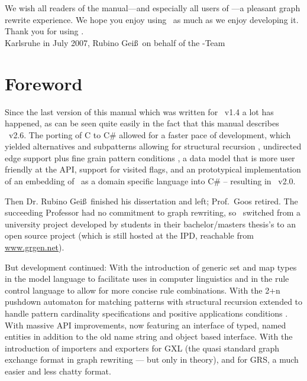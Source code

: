 We wish all readers of the manual---and especially all users of \GrG---a pleasant graph rewrite experience.
We hope you enjoy using \GrG\ as much as we enjoy developing it.\\[3ex]

Thank you for using \GrG.\\[6ex]

\noindent Karlsruhe in July 2007, Rubino Gei\ss~on behalf of the \GrG-Team

\pagebreak

\chapter*{Foreword}

Since the last version of this manual which was written for \GrG\ v1.4 a lot has happened, 
as can be seen quite easily in the fact that this manual describes \GrG\ v2.6.
The porting of C to C\# \cite{Kro:07} allowed for a faster pace of development,
which yielded alternatives and subpatterns allowing for structural recursion \cite{Jak:08,StructuralRecursion},
undirected edge support plus fine grain pattern conditions \cite{SABuchwald:2008}, 
a data model that is more user friendly at the API, support for visited flags, 
and an prototypical implementation of an embedding of \GrG\ as a domain specific language into C\# \cite{DAMoritz}
-- resulting in \GrG\ v2.0.
\medskip

Then Dr. Rubino Gei\ss~finished his dissertation \cite{DissRuby} and left; Prof.\ Goos retired.
The succeeding Professor had no commitment to graph rewriting,
so \GrG\ switched from a university project developed by students in their bachelor/masters thesis's
to an open source project (which is still hosted at the IPD, reachable from \url{www.grgen.net}).
\medskip

But development continued:
With the introduction of generic set and map types in the model language to facilitate uses in computer linguistics
and in the rule control language to allow for more concise rule combinations.
With the 2+n pushdown automaton for matching patterns with structural recursion extended 
to handle pattern cardinality specifications and positive applications conditions \cite{ExpressiveConvenientFast:2010}.
With massive API improvements, now featuring an interface of typed, named entities in addition to the old name string and object based interface.
With the introduction of importers and exporters for GXL (the quasi standard graph exchange format in graph rewriting --- but only in theory),
and for GRS, a much easier and less chatty format.\smallskip

